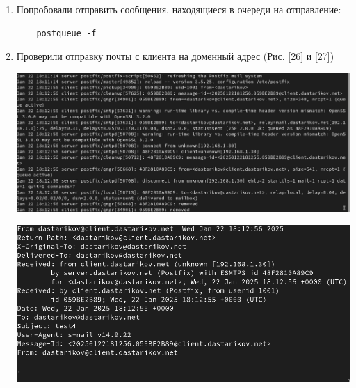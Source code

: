 \begin{enumerate}
\item Попробовали отправить сообщения, находящиеся в очереди на отправление:
  \begin{verbatim}
    postqueue -f
  \end{verbatim}
\item Проверили отправку почты с клиента на доменный адрес (Рис. \ref{26} и \ref{27})
\begin{center}
    \centering
    \includegraphics[width=\textwidth]{../images/image26.png}
    \label{26}
\begin{center}
    \centering
    \includegraphics[width=\textwidth]{../images/image27.png}
    \label{27}
\end{center}

\end{center}

\end{enumerate}
